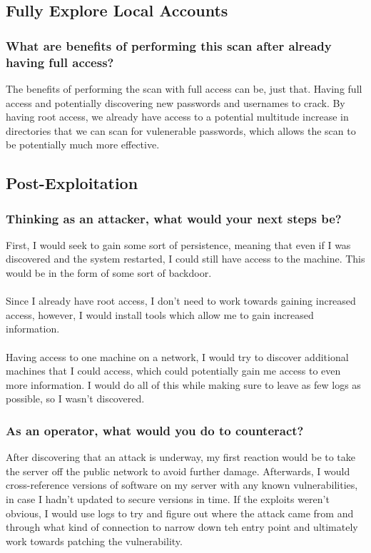 \subsection{Fully Explore Local Accounts}
\subsubsection{What are benefits of performing this scan after already having full access?}
The benefits of performing the scan with full access can be, just that. Having full access and potentially discovering new passwords and usernames to crack. By having root access, we already have access to a potential multitude increase in directories that we can scan for vulenerable passwords, which allows the scan to be potentially much more effective.

\subsection{Post-Exploitation}
\subsubsection{Thinking as an attacker, what would your next steps be?}
First, I would seek to gain some sort of persistence, meaning that even if I was discovered and the system restarted, I could still have access to the machine. This would be in the form of some sort of backdoor.
\\\\
Since I already have root access, I don't need to work towards gaining increased access, however, I would install tools which allow me to gain increased information.
\\\\
Having access to one machine on a network, I would try to discover additional machines that I could access, which could potentially gain me access to even more information. I would do all of this while making sure to leave as few logs as possible, so I wasn't discovered.
\subsubsection{As an operator, what would you do to counteract?}
After discovering that an attack is underway, my first reaction would be to take the server off the public network to avoid further damage. Afterwards, I would cross-reference versions of software on my server with any known vulnerabilities, in case I hadn't updated to secure versions in time. If the exploits weren't obvious, I would use logs to try and figure out where the attack came from and through what kind of connection to narrow down teh entry point and ultimately work towards patching the vulnerability.

